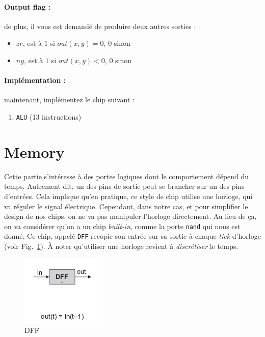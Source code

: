 \documentclass[11pt]{article}
\begin{document}
\paragraph{Output flag :} de plus, il vous est demandé de produire deux autres sorties :

\begin{itemize}
\item \(zr\), est à \(1\) si \(out(x,y) = 0\), \(0\) sinon
\item \(ng\), est à \(1\) si \(out(x,y) < 0\), \(0\) sinon
\end{itemize}

\paragraph{Implémentation :} maintenant, implémentez le chip suivant :
\begin{enumerate}
\item \texttt{ALU} (13 instructions)
\end{enumerate}

\section{Memory}
\label{sec:memory}

Cette partie s'intéresse à des portes logiques dont le comportement dépend du temps. Autrement dit, un des pins de sortie peut se brancher sur un des pins d'entrées. Cela implique qu'en pratique, ce style de chip utilise une horloge, qui va réguler le signal électrique. Cependant, dans notre cas, et pour simplifier le design de nos chips, on ne va pas manipuler l'horloge directement. Au lieu de ça, on va considérer qu'on a un chip \textit{built-in}, comme la porte \texttt{nand} qui nous est donné. Ce chip, appelé \texttt{DFF} recopie son entrée sur sa sortie à chaque \textit{tick} d'horloge (voir Fig.~\ref{fig:dff}). À noter qu'utiliser une horloge revient à \textit{discrétiser} le temps.

\begin{figure}
  \centering
  \label{fig:dff}
  \includegraphics{pictures/dff.png}
  \caption{DFF}
\end{figure}
\end{document}

